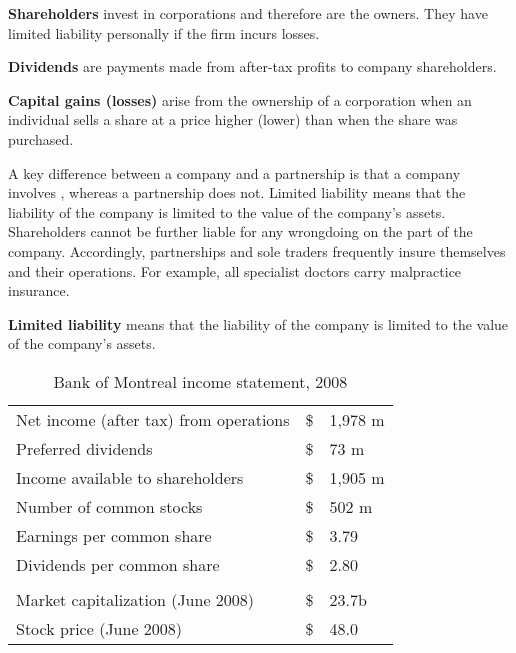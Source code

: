 \begin{DefBox}
\textbf{Shareholders} invest in corporations and therefore are the owners. They have limited liability personally if the firm incurs losses.

\textbf{Dividends} are payments made from after-tax profits to company shareholders.

\textbf{Capital gains (losses)} arise from the ownership of a corporation when an individual sells a share at a price higher (lower) than when the share was purchased.
\end{DefBox}

A key difference between a company and a partnership is that a company involves , whereas a partnership does not. Limited liability means that the liability of the company is limited to the value of the company's assets. Shareholders cannot be further liable for any wrongdoing on the part of the company. Accordingly, partnerships and sole traders frequently insure themselves and their operations. For example, all specialist doctors carry malpractice insurance.

\begin{DefBox}
\textbf{Limited liability} means that the liability of the company is limited to the value of the company's assets.
\end{DefBox}

\begin{table}[H]
\begin{center}
\begin{tabu} to 30em {|X[5,l]X[0.25,c]X[1,r]|} \hline 
{}	Net income (after tax) from operations	&	\$	&	1,978 m 		\\
						Preferred dividends						&	\$	&	73 m 			\\
	Income available to shareholders		& \$	&	1,905 m 		\\
						Number of common stocks					&	\$	&	502 m 			\\
	Earnings per common share				&	\$	&	3.79 			\\
						Dividends per common share				&	\$	&	2.80 			\\
											&			&				\\
						Market capitalization  (June 2008)		&	\$	&	23.7b			\\
	Stock price  (June 2008)				&	\$	&	48.0    		\\ \hline 
\end{tabu}
\end{center}
\caption{Bank of Montreal income statement, 2008 \label{table:BMO2008}}
\end{table}

